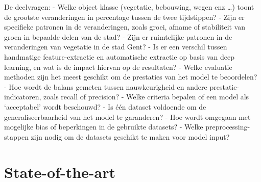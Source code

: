 \textcolor{hogent-darkgreen}{De deelvragen:
\newline
- Welke object klasse (vegetatie, bebouwing, wegen enz \ldots) toont de grootste veranderingen in percentage tussen de twee tijdstippen?
\newline
- Zijn er specifieke patronen in de veranderingen, zoals groei, afname of stabiliteit van groen in bepaalde delen van de stad?
\newline
- Zijn er ruimtelijke patronen in de veranderingen van vegetatie in de stad Gent?
\newline
- Is er een verschil tussen handmatige feature-extractie en automatische extractie op basis van deep learning, en wat is de impact hiervan op de resultaten?
\newline
- Welke evaluatie methoden zijn het meest geschikt om de prestaties van het model te beoordelen?
\newline
- Hoe wordt de balans gemeten tussen nauwkeurigheid en andere prestatie-indicatoren, zoals recall of precision?
\newline
- Welke criteria bepalen of een model als `acceptabel' wordt beschouwd?
\newline
- Is één dataset voldoende om de generaliseerbaarheid van het model te garanderen?
\newline
- Hoe wordt omgegaan met mogelijke bias of beperkingen in de gebruikte datasets?
\newline
- Welke preprocessing-stappen zijn nodig om de datasets geschikt te maken voor model input?}




\section{State-of-the-art}%
\label{sec:state-of-the-art}



